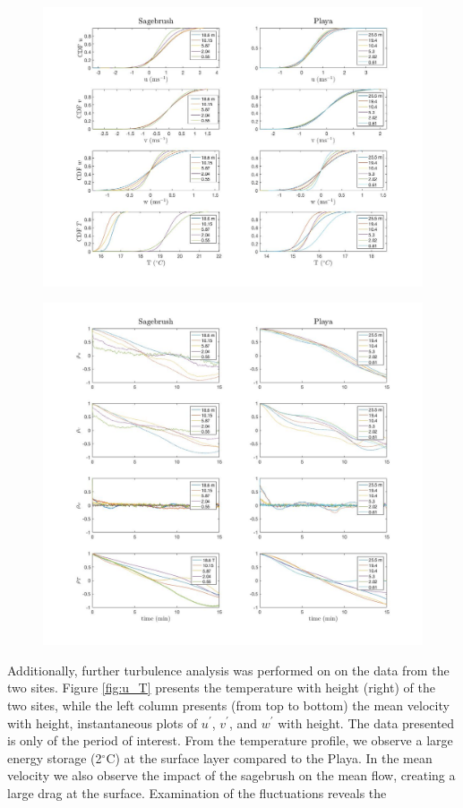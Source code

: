 \documentclass[]{article}
\begin{document}
\begin{figure}
\centering
\includegraphics[width=\textwidth]{cdf}
\caption{}
\label{fig:cdf}
\end{figure}
\begin{figure}
	\centering
	\includegraphics[width=\textwidth]{auto_corr_fig}
	\caption{}
	\label{fig:autocorr}
\end{figure}
Additionally, further turbulence analysis was performed on on the data from the two sites. Figure \ref{fig:u_T} presents the temperature with height (right) of the two sites, while the left column presents (from top to bottom) the mean velocity with height, instantaneous plots of $u^\prime$,  $v^\prime$, and $w^\prime$ with height. The data presented is only of the period of interest. From the temperature profile, we observe a large energy storage (2$^\circ$C) at the surface layer compared to the Playa. In the mean velocity we also observe the impact of the sagebrush on the mean flow, creating a large drag at the surface. Examination of the fluctuations reveals the  
\end{document}
